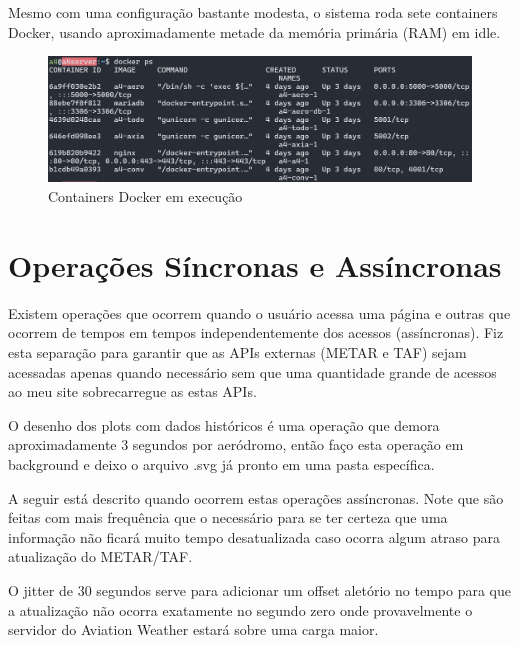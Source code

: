 Mesmo com uma configuração bastante modesta, o sistema roda sete containers Docker, usando 
aproximadamente metade da memória primária (RAM) em idle.

\begin{figure}[ht]
    \begin{center}
    \includegraphics[width=400pt]{img/containers.png}
    \caption{Containers Docker em execução}
    \label{fig:containers}
    \end{center}
\end{figure}

\section{Operações Síncronas e Assíncronas}

Existem operações que ocorrem quando o usuário acessa uma página e outras que
ocorrem de tempos em tempos independentemente dos acessos (assíncronas). Fiz
esta separação para garantir que as APIs externas (METAR e TAF) sejam acessadas 
apenas quando
necessário sem que uma quantidade grande de acessos ao meu site sobrecarregue as estas APIs.

O desenho dos plots com dados históricos é uma operação que demora aproximadamente
3 segundos por aeródromo, então faço esta operação em background e deixo o 
arquivo .svg já pronto em uma pasta específica.

A seguir está descrito quando ocorrem estas operações assíncronas. Note que são
feitas com mais frequência que o necessário para se ter certeza que uma informação não
ficará muito tempo desatualizada caso ocorra algum atraso para atualização do METAR/TAF.

O jitter de 30 segundos serve para adicionar um offset aletório no tempo para que
a atualização não ocorra exatamente no segundo zero onde provavelmente o servidor
do Aviation Weather estará sobre uma carga maior.

